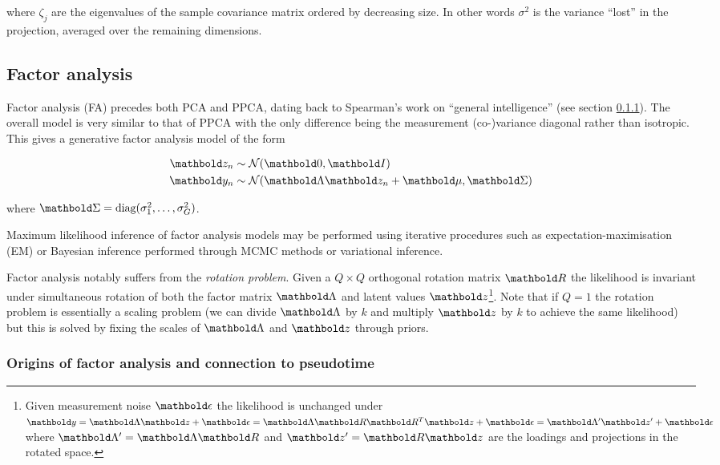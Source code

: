 where $\zeta_j$ are the eigenvalues of the sample covariance matrix ordered by decreasing size. In other words $\sigma^2$ is the variance ``lost'' in the projection, averaged over the remaining dimensions.

\subsection{Factor analysis} \label{sec:intr:fa}

Factor analysis (FA) precedes both PCA and PPCA, dating back to Spearman's work on ``general intelligence'' \cite{spearman1904general} (see section \ref{intr:fa_hist}). The overall model is very similar to that of PPCA with the only difference being the measurement (co-)variance diagonal rather than isotropic. This gives a generative factor analysis model of the form

\begin{equation} \label{eq:fa}
  \begin{aligned}
    \mbz_n & \sim \Norm(\mbzero, \mbI) \\
    \mby_n & \sim \Norm(\mbLambda \mbz_n + \mbmu, \mbSigma)
  \end{aligned}
\end{equation}

where $\mbSigma = \text{diag}(\sigma_1^2, \ldots, \sigma_G^2)$.

Maximum likelihood inference of factor analysis models may be performed using iterative procedures such as expectation-maximisation (EM) or Bayesian inference performed through MCMC methods or variational inference.

Factor analysis notably suffers from the \emph{rotation problem}. Given a $Q \times Q$ orthogonal rotation matrix $\mbR$ the likelihood is invariant under simultaneous rotation of both the factor matrix $\mbLambda$ and latent values $\mbz$\footnote{
Given measurement noise $\mbepsilon$ the likelihood is unchanged under $\mby = \mbLambda \mbz + \mbepsilon = \mbLambda \mbR \mbR^T \mbz + \mbepsilon = \mbLambda' \mbz' + \mbepsilon$ where $\mbLambda' = \mbLambda \mbR$ and $\mbz' = \mbR \mbz$ are the loadings and projections in the rotated space.
}. %
Note that if $Q=1$ the rotation problem is essentially a scaling problem (we can divide $\mbLambda$ by $k$ and multiply $\mbz$ by $k$ to achieve the same likelihood) but this is solved by fixing the scales of $\mbLambda$ and $\mbz$ through priors.

\subsubsection{Origins of factor analysis and connection to pseudotime} \label{intr:fa_hist}



